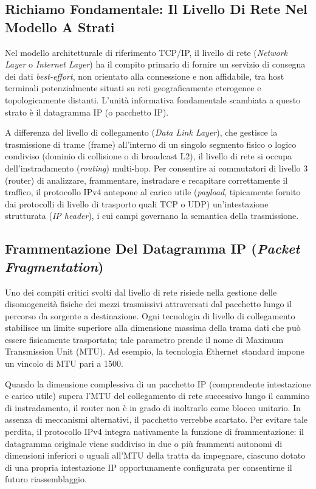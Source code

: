 \documentclass[11pt, a4paper]{article}
\begin{document}
\subsection{Richiamo Fondamentale: Il Livello Di Rete Nel Modello A Strati}
Nel modello architetturale di riferimento TCP/IP, il livello di rete (\emph{Network Layer} o \emph{Internet Layer}) ha il compito primario di fornire un servizio di consegna dei dati \emph{best-effort}, non orientato alla connessione e non affidabile, tra host terminali potenzialmente situati su reti geograficamente eterogenee e topologicamente distanti. L'unità informativa fondamentale scambiata a questo strato è il datagramma IP (o pacchetto IP).

A differenza del livello di collegamento (\emph{Data Link Layer}), che gestisce la trasmissione di trame (frame) all'interno di un singolo segmento fisico o logico condiviso (dominio di collisione o di broadcast L2), il livello di rete si occupa dell'instradamento (\emph{routing}) multi-hop. Per consentire ai commutatori di livello 3 (router) di analizzare, frammentare, instradare e recapitare correttamente il traffico, il protocollo IPv4 antepone al carico utile (\emph{payload}, tipicamente fornito dai protocolli di livello di trasporto quali TCP o UDP) un'intestazione strutturata (\emph{IP header}), i cui campi governano la semantica della trasmissione.

\subsection{Frammentazione Del Datagramma IP (\emph{Packet Fragmentation})}
Uno dei compiti critici svolti dal livello di rete risiede nella gestione delle disomogeneità fisiche dei mezzi trasmissivi attraversati dal pacchetto lungo il percorso da sorgente a destinazione. Ogni tecnologia di livello di collegamento stabilisce un limite superiore alla dimensione massima della trama dati che può essere fisicamente trasportata; tale parametro prende il nome di Maximum Transmission Unit (MTU). Ad esempio, la tecnologia Ethernet standard impone un vincolo di MTU pari a \SI{1500}{\byte}.

Quando la dimensione complessiva di un pacchetto IP (comprendente intestazione e carico utile) supera l'MTU del collegamento di rete successivo lungo il cammino di instradamento, il router non è in grado di inoltrarlo come blocco unitario. In assenza di meccanismi alternativi, il pacchetto verrebbe scartato. Per evitare tale perdita, il protocollo IPv4 integra nativamente la funzione di frammentazione: il datagramma originale viene suddiviso in due o più frammenti autonomi di dimensioni inferiori o uguali all'MTU della tratta da impegnare, ciascuno dotato di una propria intestazione IP opportunamente configurata per consentirne il futuro riassemblaggio.
\end{document}
